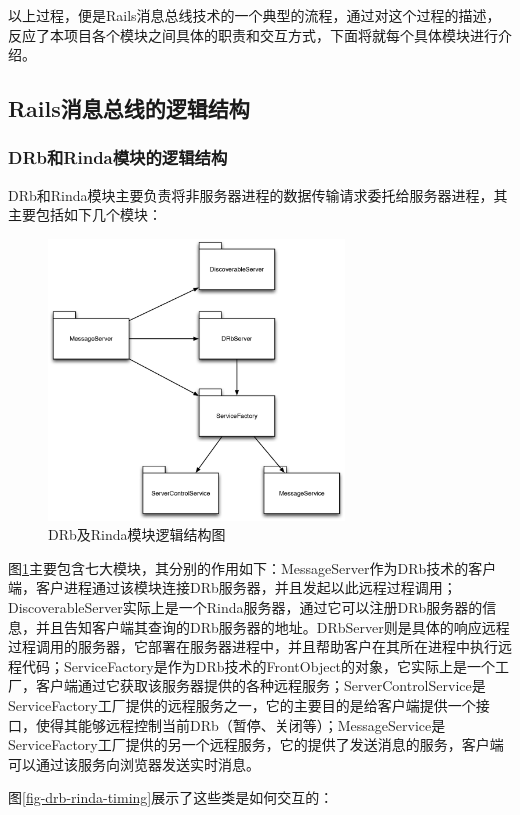 以上过程，便是Rails消息总线技术的一个典型的流程，通过对这个过程的描述，反应了本项目各个模块之间具体的职责和交互方式，下面将就每个具体模块进行介绍。
\subsection{Rails消息总线的逻辑结构}
\subsubsection{DRb和Rinda模块的逻辑结构}
DRb和Rinda模块主要负责将非服务器进程的数据传输请求委托给服务器进程，其主要包括如下几个模块：

\begin{figure}[h]
\centering
\includegraphics[width=0.7\textwidth]{images/overview/drb_rinda.eps}
\caption{DRb及Rinda模块逻辑结构图}
\label{fig-drb-rinda}
\end{figure}

图\ref{fig-drb-rinda}主要包含七大模块，其分别的作用如下：MessageServer作为DRb技术的客户端，客户进程通过该模块连接DRb服务器，并且发起以此远程过程调用；DiscoverableServer实际上是一个Rinda服务器，通过它可以注册DRb服务器的信息，并且告知客户端其查询的DRb服务器的地址。DRbServer则是具体的响应远程过程调用的服务器，它部署在服务器进程中，并且帮助客户在其所在进程中执行远程代码；ServiceFactory是作为DRb技术的FrontObject的对象，它实际上是一个工厂，客户端通过它获取该服务器提供的各种远程服务；ServerControlService是ServiceFactory工厂提供的远程服务之一，它的主要目的是给客户端提供一个接口，使得其能够远程控制当前DRb（暂停、关闭等）；MessageService是ServiceFactory工厂提供的另一个远程服务，它的提供了发送消息的服务，客户端可以通过该服务向浏览器发送实时消息。

图\ref{fig-drb-rinda-timing}展示了这些类是如何交互的：

